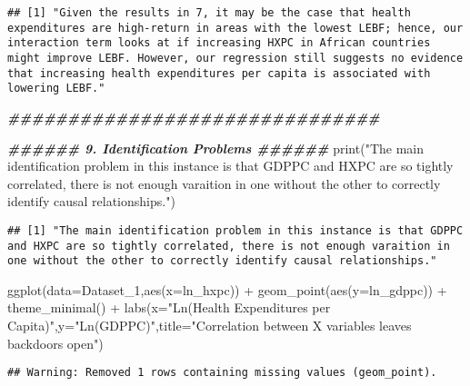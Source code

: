 \documentclass[
]{article}
\newenvironment{Shaded}{\begin{snugshade}}{\end{snugshade}}
\newcommand{\AttributeTok}[1]{\textcolor[rgb]{0.77,0.63,0.00}{#1}}
\newcommand{\DocumentationTok}[1]{\textcolor[rgb]{0.56,0.35,0.01}{\textbf{\textit{#1}}}}
\newcommand{\FunctionTok}[1]{\textcolor[rgb]{0.00,0.00,0.00}{#1}}
\newcommand{\NormalTok}[1]{#1}
\newcommand{\SpecialCharTok}[1]{\textcolor[rgb]{0.00,0.00,0.00}{#1}}
\newcommand{\StringTok}[1]{\textcolor[rgb]{0.31,0.60,0.02}{#1}}
\begin{document}
\begin{verbatim}
## [1] "Given the results in 7, it may be the case that health expenditures are high-return in areas with the lowest LEBF; hence, our interaction term looks at if increasing HXPC in African countries might improve LEBF. However, our regression still suggests no evidence that increasing health expenditures per capita is associated with lowering LEBF."
\end{verbatim}

\begin{Shaded}
\begin{Highlighting}[]
\DocumentationTok{\#\#\#\#\#\#\#\#\#\#\#\#\#\#\#\#\#\#\#\#\#\#\#\#\#\#\#\#\#\#\#}


\DocumentationTok{\#\#\#\#\#\# 9. Identification Problems \#\#\#\#\#\#}
\FunctionTok{print}\NormalTok{(}\StringTok{"The main identification problem in this instance is that GDPPC and HXPC are so tightly correlated, there is not enough varaition in one without the other to correctly identify causal relationships."}\NormalTok{)}
\end{Highlighting}
\end{Shaded}

\begin{verbatim}
## [1] "The main identification problem in this instance is that GDPPC and HXPC are so tightly correlated, there is not enough varaition in one without the other to correctly identify causal relationships."
\end{verbatim}

\begin{Shaded}
\begin{Highlighting}[]
\FunctionTok{ggplot}\NormalTok{(}\AttributeTok{data=}\NormalTok{Dataset\_1,}\FunctionTok{aes}\NormalTok{(}\AttributeTok{x=}\NormalTok{ln\_hxpc)) }\SpecialCharTok{+} \FunctionTok{geom\_point}\NormalTok{(}\FunctionTok{aes}\NormalTok{(}\AttributeTok{y=}\NormalTok{ln\_gdppc)) }\SpecialCharTok{+} 
  \FunctionTok{theme\_minimal}\NormalTok{() }\SpecialCharTok{+} \FunctionTok{labs}\NormalTok{(}\AttributeTok{x=}\StringTok{"Ln(Health Expenditures per Capita)"}\NormalTok{,}\AttributeTok{y=}\StringTok{"Ln(GDPPC)"}\NormalTok{,}\AttributeTok{title=}\StringTok{"Correlation between X variables leaves backdoors open"}\NormalTok{)}
\end{Highlighting}
\end{Shaded}

\begin{verbatim}
## Warning: Removed 1 rows containing missing values (geom_point).
\end{verbatim}
\end{document}
